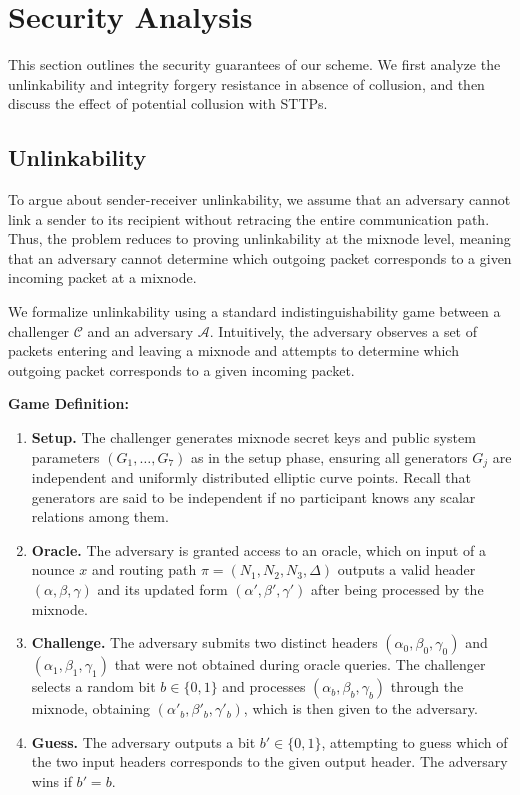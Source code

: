 \section{Security Analysis}\label{sec:security}

This section outlines the security guarantees of our scheme.  
We first analyze the unlinkability and integrity forgery resistance in absence of collusion, and then discuss the effect of potential collusion with STTPs.



\subsection{Unlinkability}\label{sec:unlinkability}

To argue about sender-receiver unlinkability, we assume that an adversary cannot link a sender to its recipient without retracing the entire communication path.  
Thus, the problem reduces to proving unlinkability at the mixnode level, meaning that an adversary cannot determine which outgoing packet corresponds to a given incoming packet at a mixnode.

We formalize unlinkability using a standard indistinguishability game between a challenger $\mathcal{C}$ and an adversary $\mathcal{A}$.  
Intuitively, the adversary observes a set of packets entering and leaving a mixnode and attempts to determine which outgoing packet corresponds to a given incoming packet.
\newline

\noindent\textbf{Game Definition:}
\begin{enumerate}
\item \textbf{Setup.}
  The challenger generates mixnode secret keys and public system parameters $(G_1, \dots, G_7)$ as in the setup phase, ensuring all generators $G_j$ are independent and uniformly distributed elliptic curve points.
  Recall that generators are said to be independent if no participant knows any scalar relations among them.

  \item \textbf{Oracle.}  
  The adversary is granted access to an oracle, which on input of a nounce $x$ and routing path $\pi = (N_1, N_2, N_3, \Delta)$ outputs a valid header $(\alpha, \beta, \gamma)$ and its updated form $(\alpha', \beta', \gamma')$ after being processed by the mixnode.

  \item \textbf{Challenge.}
  The adversary submits two distinct headers $(\alpha_0, \beta_0, \gamma_0)$ and $(\alpha_1, \beta_1, \gamma_1)$ that were not obtained during oracle queries.  
  The challenger selects a random bit $b \in \{0,1\}$ and processes $(\alpha_b, \beta_b, \gamma_b)$ through the mixnode, obtaining $(\alpha'_b, \beta'_b, \gamma'_b)$, which is then given to the adversary.

  \item \textbf{Guess.}
  The adversary outputs a bit $b' \in \{0,1\}$, attempting to guess which of the two input headers corresponds to the given output header.  
  The adversary wins if $b' = b$.
\end{enumerate}

